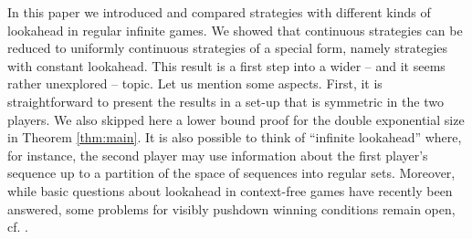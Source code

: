 \documentclass[fleqn,envcountsame]{LMCS}
\begin{document}
In this paper we introduced and compared strategies
with different kinds of lookahead in regular infinite games.
We showed that continuous strategies can be reduced to
uniformly continuous strategies of a special form,
namely strategies with constant lookahead.
This result is a first step into a wider -- and it
seems rather unexplored -- topic. Let us mention some
aspects. First, it is straightforward to present
the results in a set-up that is symmetric in the two players.
We also skipped here a lower bound proof for the
double exponential size in Theorem \ref{thm:main}.
It is also possible to think of ``infinite lookahead'' where,
for instance, the second player may use information about
the first player's sequence up to a partition of the
space of sequences into regular sets. Moreover, while
basic questions about lookahead in context-free games have
recently been answered, some problems for visibly pushdown
winning conditions remain open, cf. \cite{FLZ11}.
\end{document}
